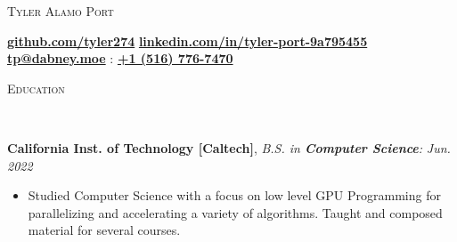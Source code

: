 \documentclass[8pt]{article}
\newenvironment{changemargin}[2]{%
  \begin{list}{}{%
    \setlength{\topsep}{0pt}%
    \setlength{\leftmargin}{#1}%
    \setlength{\rightmargin}{#2}%
    \setlength{\listparindent}{\parindent}%
    \setlength{\itemindent}{\parindent}%
    \setlength{\parsep}{\parskip}%
  }%
  \item[]}{\end{list}
}
\newcommand{\lineover}{
	\begin{changemargin}{-0.05in}{-0.05in}
		\vspace*{-8pt}
		\hrulefill \\
		\vspace*{-2pt}
	\end{changemargin}
}
\newcommand{\header}[1]{
	\begin{changemargin}{-0.5in}{-0.5in}
		\scshape{#1}\\
  	\lineover
	\end{changemargin}
}
\newenvironment{body} {
	\vspace*{-16pt}
	\begin{changemargin}{-0.25in}{-0.5in}
  }	
	{\end{changemargin}
}
\begin{document}
\begin{center}
	\vspace*{-48pt}
	{\Large \scshape Tyler Alamo Port}
\end{center}
\vspace*{-2pt}
\hspace{7.25mm} \faGithub \hspace{0.25mm} \textbf{\href{https://github.com/tyler274}{github.com/tyler274}} \hspace{7.25mm} \faLinkedinSquare \hspace{0.25mm} \textbf{\href{https://linkedin.com/in/tyler-port-9a795455/}{linkedin.com/in/tyler-port-9a795455}} \\
\vspace*{3pt}  \hspace{12.25mm} \faEnvelope \hspace{0.1mm} \textbf{\href{mailto:tp@dabney.moe}{tp@dabney.moe}} \hspace{8.25mm} \faMobile : \textbf{\href{tel:+15167767470}{+1 (516) 776-7470}}\\
\vspace*{-9pt}
\smallskip

\header{Education}
\begin{body}
	\vspace{14pt}
	\textbf{California Inst. of Technology [Caltech]}{}, \emph{B.S. in
	\textbf{Computer Science}:} \hfill \emph{Jun. 2022}{} \\
	\vspace{-3pt}
	\begin{itemize} \itemsep -0pt
		\item Studied Computer Science with a focus on low level GPU Programming for
		parallelizing and accelerating a variety of algorithms. Taught and composed material for
		several courses.
	\end{itemize}
\end{body}

\smallskip
\vspace*{-9pt}
\end{document}
